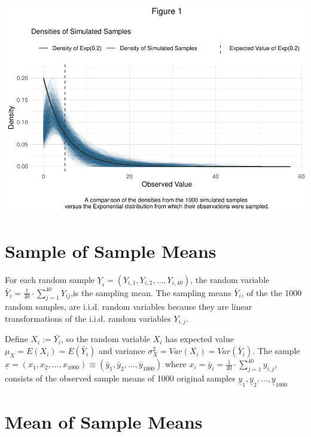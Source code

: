 \documentclass[
]{article}
\begin{document}
       \includegraphics{CLT_files/figure-latex/unnamed-chunk-4-1.pdf}

       \hypertarget{sample-of-sample-means}{%
       \section{Sample of Sample Means}\label{sample-of-sample-means}}

       For each random sample
       \(\underline{Y}_i = (Y_{i,1}, Y_{i,2}, \dots, Y_{i,40})\), the
       random variable
       \(\bar{Y}_i = \frac{1}{40} \cdot \sum_{j = 1}^{40} Y_{ij}\),is
       the sampling mean. The sampling means \(\bar{Y}_i\), of the the
       1000 random samples, are i.i.d. random variables because they are
       linear transformations of the i.i.d. random variables
       \(Y_{i,j}\).

       Define \(X_i:=\bar{Y_i}\), so the random variable \(X_i\) has
       expected value \(\mu_X = E(X_i) = E(\bar{Y}_i)\) and variance
       \(\sigma_X^2 = Var(X_i) = Var(\bar{Y}_i)\). The sample
       \(\underline{x} = (x_1, x_2, \dots, x_{1000}) \equiv (\bar{y}_1, \bar{y}_2, \dots, \bar{y}_{1000})\)
       where
       \(x_i = \bar{y}_i = \frac{1}{40} \cdot \sum_{j = 1}^{40} y_{i,j}\),
       consists of the observed sample means of 1000 original samples
       \(\underline{y}_1, \underline{y}_2, \dots, \underline{y}_{1000}\)

       \hypertarget{mean-of-sample-means}{%
       \section{Mean of Sample Means}\label{mean-of-sample-means}}
\end{document}
